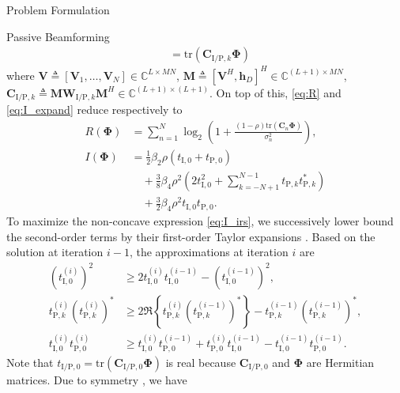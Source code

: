 \documentclass[journal]{IEEEtran}
\begin{document}
\begin{section}{Problem Formulation}
\begin{subsection}{Passive Beamforming}
\begin{align}
				& = \mathrm{tr}(\boldsymbol{C}_{\mathrm{I/P},k}\boldsymbol{\Phi})\label{eq:t_k}
			\end{align}
			where $\boldsymbol{V} \triangleq [\boldsymbol{V}_1,\dots,\boldsymbol{V}_N] \in \mathbb{C}^{L \times MN}$, $\boldsymbol{M} \triangleq [\boldsymbol{V}^H, \boldsymbol{h}_{D}]^H \in \mathbb{C}^{(L+1) \times MN}$, $\boldsymbol{C}_{\mathrm{I/P},k} \triangleq \boldsymbol{M}\boldsymbol{W}_{\mathrm{I/P},k}\boldsymbol{M}^H \in \mathbb{C}^{(L+1)\times(L+1)}$. On top of this, \eqref{eq:R} and \eqref{eq:I_expand} reduce respectively to
			\begin{align}
				R(\boldsymbol{\Phi})
				& = \sum_{n=1}^{N}{\log_2\left(1+\frac{(1-\rho)\mathrm{tr}(\boldsymbol{C}_n\boldsymbol{\Phi})}{\sigma_n^2}\right)},\label{eq:R_irs}\\
				I(\boldsymbol{\Phi})
				& = \frac{1}{2}{\beta_2}{\rho}(t_{\mathrm{I},0}+t_{\mathrm{P},0})\nonumber\\
				& \quad + \frac{3}{8}{\beta_4}{\rho^2} \left(2t_{\mathrm{I},0}^2 + \sum_{k=-N+1}^{N-1}{t_{\mathrm{P},k}t_{\mathrm{P},k}^*}\right)\nonumber\\
				& \quad + \frac{3}{2}{\beta_4}{\rho^2}t_{\mathrm{I},0}t_{\mathrm{P},0}.\label{eq:I_irs}
			\end{align}
			To maximize the non-concave expression \eqref{eq:I_irs}, we successively lower bound the second-order terms by their first-order Taylor expansions \cite{Adali2010}. Based on the solution at iteration $i - 1$, the approximations at iteration $i$ are
			\begin{align}
				(t_{\mathrm{I},0}^{(i)})^2
				& \ge 2 t_{\mathrm{I},0}^{(i)}t_{\mathrm{I},0}^{(i-1)} - (t_{\mathrm{I},0}^{(i-1)})^2,\label{eq:taylor_1}\\
				t_{\mathrm{P},k}^{(i)} (t_{\mathrm{P},k}^{(i)})^*
				& \ge 2 \Re\left\{t_{\mathrm{P},k}^{(i)} (t_{\mathrm{P},k}^{(i-1)})^*\right\} - t_{\mathrm{P},k}^{(i-1)} (t_{\mathrm{P},k}^{(i-1)})^*,\label{eq:taylor_2}\\
				t_{\mathrm{I},0}^{(i)} t_{\mathrm{P},0}^{(i)}
				& \ge t_{\mathrm{I},0}^{(i)} t_{\mathrm{P},0}^{(i-1)} + t_{\mathrm{P},0}^{(i)} t_{\mathrm{I},0}^{(i-1)} - t_{\mathrm{I},0}^{(i-1)} t_{\mathrm{P},0}^{(i-1)}.\label{eq:taylor_3}
			\end{align}
			Note that $t_{\mathrm{I/P},0}=\mathrm{tr}(\boldsymbol{C}_{\mathrm{I/P},0}\boldsymbol{\Phi})$ is real because $\boldsymbol{C}_{\mathrm{I/P},0}$ and $\boldsymbol{\Phi}$ are Hermitian matrices. Due to symmetry \cite{Huang2017}, we have
			\begin{equation}\label{eq:coupled_terms}

\end{equation}
\end{subsection}
\end{section}
\end{document}
